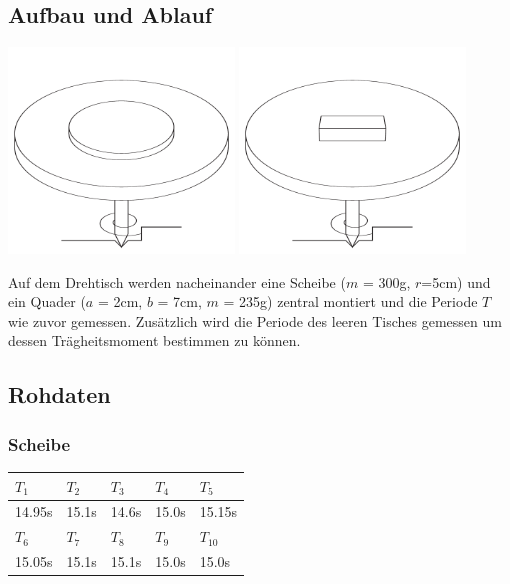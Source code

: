 \documentclass[12pt,a4paper]{article}
\begin{document}
\subsection*{Aufbau und Ablauf}
\begin{center}
\includegraphics[width=6cm]{illustration21.pdf}
\includegraphics[width=6cm]{illustration22.pdf}
\end{center}
Auf dem Drehtisch werden nacheinander eine Scheibe ($m$ = 300g, $r$=5cm) und ein Quader ($a$ = 2cm, $b$ = 7cm, $m$ = 235g) zentral montiert und die Periode $T$ wie zuvor gemessen. Zus\"atzlich wird die Periode des leeren Tisches gemessen um dessen Tr\"agheitsmoment bestimmen zu k\"onnen.

\subsection*{Rohdaten}
\subsubsection*{Scheibe}
\begin{tabular}{|l|l|l|l|l|}
\hline
$T_{1}$&$T_{2}$&$T_{3}$&$T_{4}$&$T_{5}$\\
\hline
14.95s&15.1s&14.6s&15.0s&15.15s\\
\hline
\hline
$T_{6}$&$T_{7}$&$T_{8}$&$T_{9}$&$T_{10}$\\
\hline
15.05s&15.1s&15.1s&15.0s&15.0s\\
\hline
\end{tabular}
\end{document}
